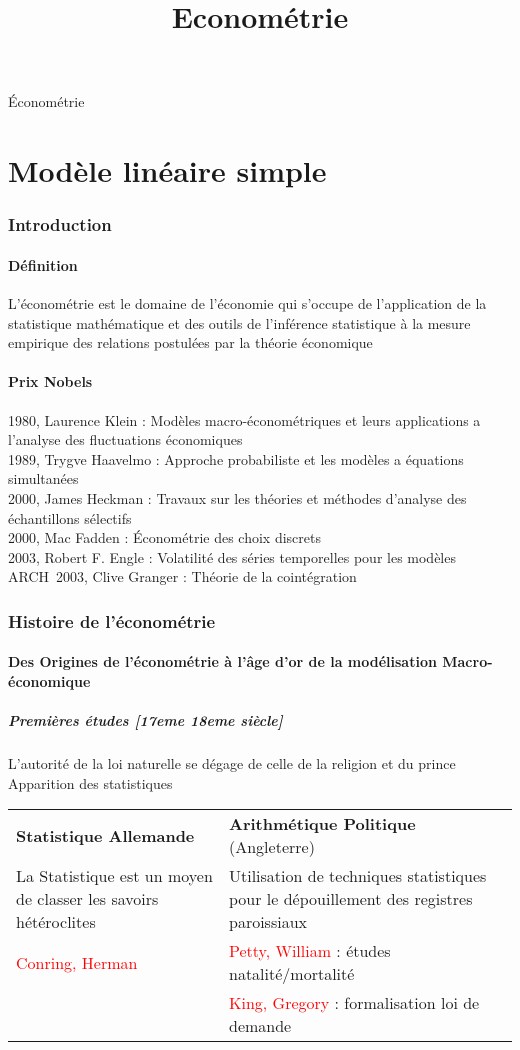 \documentclass{article}
\title{Econométrie}
\begin{document}
{\Huge Économétrie}
\tableofcontents
\newpage
\part{Modèle linéaire simple}
\section{Introduction}
\subsection{Définition}
L'économétrie est le domaine de l'économie qui s'occupe de l'application de la statistique mathématique et des outils de l'inférence statistique à la mesure empirique des relations postulées par la théorie économique
\subsection{Prix Nobels}
1980, Laurence Klein : Modèles macro-économétriques et leurs applications a l'analyse des fluctuations économiques\\
1989, Trygve Haavelmo : Approche probabiliste et les modèles a équations simultanées\\
2000, James Heckman : Travaux sur les théories et méthodes d'analyse des échantillons sélectifs\\
2000, Mac Fadden : Économétrie des choix discrets\\
2003, Robert F. Engle : Volatilité des séries temporelles pour les modèles ARCH\
2003, Clive Granger : Théorie de la cointégration
\section{Histoire de l'économétrie}
\subsection{Des Origines de l'économétrie à l'âge d'or de la modélisation Macro-économique}
\subsubsection{Premières études [17eme 18eme siècle]}
L'autorité de la loi naturelle se dégage de celle de la religion et du prince\\
Apparition des statistiques
\begin{center}
\begin{tabular}{m{200pt}|m{200pt}}
\textbf{Statistique Allemande} & \textbf{Arithmétique Politique} (Angleterre)\\
La Statistique est un moyen de classer les savoirs hétéroclites & Utilisation de techniques statistiques pour le dépouillement des registres paroissiaux \\
\textcolor{red}{Conring, Herman} & \textcolor{red}{Petty, William } : études natalité/mortalité\\
& \textcolor{red}{King, Gregory} : formalisation loi de demande
\end{tabular}
\end{center}
\end{document}
